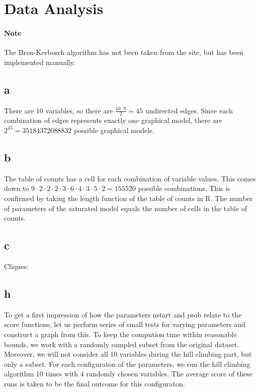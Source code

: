 \documentclass[12pt]{article}
\theoremstyle{definition}
\begin{document}
\maketitle

\section*{Data Analysis}
\label{sec:data_analysis}

\paragraph{Note}
The Bron-Kerbosch algorithm has not been taken from the site, but has been implemented manually.

\subsection*{a}
There are 10 variables, so there are $\frac{10 \cdot 9}{2} = 45$ undirected edges.
Since each combination of edges represents exactly one graphical model,
there are $2^{45} = 35184372088832$ possible graphical models.

\subsection*{b}
The table of counts has a cell for each combination of variable values.
This comes down to $9 \cdot 2 \cdot 2 \cdot 2 \cdot 3 \cdot 6 \cdot 4 \cdot 3 \cdot 5 \cdot 2 = 155520$ possible combinations.
This is confirmed by taking the length function of the table of counts in R.
The number of parameters of the saturated model equals the number of cells in the table of counts.

\subsection*{c}
Cliques: 

\subsection*{h}
To get a first impression of how the parameters nstart and prob relate to the score functions,
let us perform series of small tests for varying parameters and construct a graph from this.
To keep the compution time within reasonable bounds, we work with a randomly sampled subset
from the original dataset.
Moreover, we will not consider all 10 variables during the hill climbing part, but only a subset.
For each configuraton of the parameters, we run the hill climbing algorithm 10 times with 4
randomly chosen variables.
The average score of these runs is taken to be the final outcome for this configuraton.
\end{document}
